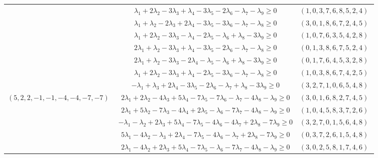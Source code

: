 \documentclass[12pt,landscape]{article}
\begin{document}
\begin{longtable}[l]{|c|c|c|}
 \cline{2-3} 
 & $\lambda_{1} + 2\lambda_{2}-3\lambda_{3} + \lambda_{4}-3\lambda_{5}-2\lambda_{6}-\lambda_{7}-\lambda_{9}\geq 0$ & $(1 ,0 ,3 ,7 ,6 ,8 ,5 ,2 ,4) \;$\\ 
 \cline{2-3} 
 & $\lambda_{1} + \lambda_{2}-2\lambda_{3} + 2\lambda_{4}-3\lambda_{5}-3\lambda_{6}-\lambda_{7}-\lambda_{8}\geq 0$ & $(3 ,0 ,1 ,8 ,6 ,7 ,2 ,4 ,5) \;$\\ 
 \cline{2-3} 
 & $\lambda_{1} + 2\lambda_{2}-3\lambda_{3}-\lambda_{4}-2\lambda_{5}-\lambda_{6} + \lambda_{8}-3\lambda_{9}\geq 0$ & $(1 ,0 ,7 ,6 ,3 ,5 ,4 ,2 ,8) \;$\\ 
 \cline{2-3} 
 & $2\lambda_{1} + \lambda_{2}-3\lambda_{3} + \lambda_{4}-3\lambda_{5}-2\lambda_{6}-\lambda_{7}-\lambda_{8}\geq 0$ & $(0 ,1 ,3 ,8 ,6 ,7 ,5 ,2 ,4) \;$\\ 
 \cline{2-3} 
 & $2\lambda_{1} + \lambda_{2}-3\lambda_{3}-2\lambda_{4}-\lambda_{5}-\lambda_{6} + \lambda_{8}-3\lambda_{9}\geq 0$ & $(0 ,1 ,7 ,6 ,4 ,5 ,3 ,2 ,8) \;$\\ 
 \cline{2-3} 
 & $\lambda_{1} + 2\lambda_{2}-3\lambda_{3} + \lambda_{4}-2\lambda_{5}-3\lambda_{6}-\lambda_{7}-\lambda_{8}\geq 0$ & $(1 ,0 ,3 ,8 ,6 ,7 ,4 ,2 ,5) \;$\\ 
 \cline{2-3} 
 & $-\lambda_{1} + \lambda_{3} + 2\lambda_{4}-3\lambda_{5}-2\lambda_{6}-\lambda_{7} + \lambda_{8}-3\lambda_{9}\geq 0$ & $(3 ,2 ,7 ,1 ,0 ,6 ,5 ,4 ,8) \;$\\ \hline\multirow{15}{*}{ $(5 ,2 ,2 ,-1 ,-1 ,-4 ,-4 ,-7 ,-7) \;$ }  & $2\lambda_{1} + 2\lambda_{2}-4\lambda_{3} + 5\lambda_{4}-7\lambda_{5}-7\lambda_{6}-\lambda_{7}-4\lambda_{8}-\lambda_{9}\geq 0$ & $(3 ,0 ,1 ,6 ,8 ,2 ,7 ,4 ,5) \;$\\ 
 \cline{2-3} 
 & $2\lambda_{1} + 5\lambda_{2}-7\lambda_{3}-4\lambda_{4} + 2\lambda_{5}-\lambda_{6}-7\lambda_{7}-4\lambda_{8}-\lambda_{9}\geq 0$ & $(1 ,0 ,4 ,5 ,8 ,3 ,7 ,2 ,6) \;$\\ 
 \cline{2-3} 
 & $-\lambda_{1}-\lambda_{2} + 2\lambda_{3} + 5\lambda_{4}-7\lambda_{5}-4\lambda_{6}-4\lambda_{7} + 2\lambda_{8}-7\lambda_{9}\geq 0$ & $(3 ,2 ,7 ,0 ,1 ,5 ,6 ,4 ,8) \;$\\ 
 \cline{2-3} 
 & $5\lambda_{1}-4\lambda_{2}-\lambda_{3} + 2\lambda_{4}-7\lambda_{5}-4\lambda_{6}-\lambda_{7} + 2\lambda_{8}-7\lambda_{9}\geq 0$ & $(0 ,3 ,7 ,2 ,6 ,1 ,5 ,4 ,8) \;$\\ 
 \cline{2-3} 
 & $2\lambda_{1}-4\lambda_{2} + 2\lambda_{3} + 5\lambda_{4}-7\lambda_{5}-\lambda_{6}-7\lambda_{7}-4\lambda_{8}-\lambda_{9}\geq 0$ & $(3 ,0 ,2 ,5 ,8 ,1 ,7 ,4 ,6) \;$\\ 

\end{longtable}
\end{document}

